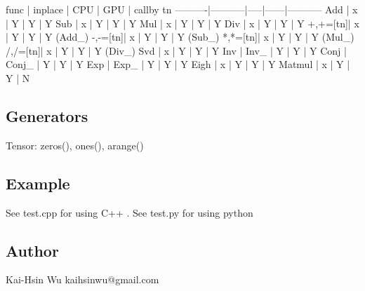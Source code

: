 \begin{DoxyVerb}  func    |   inplace | CPU | GPU  | callby tn 
----------|-----------|-----|------|-----------
  Add     |   x       |  Y  |  Y   |    Y
  Sub     |   x       |  Y  |  Y   |    Y
  Mul     |   x       |  Y  |  Y   |    Y
  Div     |   x       |  Y  |  Y   |    Y
  +,+=[tn]|   x       |  Y  |  Y   |    Y (Add_)
  -,-=[tn]|   x       |  Y  |  Y   |    Y (Sub_)
  *,*=[tn]|   x       |  Y  |  Y   |    Y (Mul_)
  /,/=[tn]|   x       |  Y  |  Y   |    Y (Div_)
  Svd     |   x       |  Y  |  Y   |    Y
  Inv     |   Inv_    |  Y  |  Y   |    Y
  Conj    |   Conj_   |  Y  |  Y   |    Y 
  Exp     |   Exp_    |  Y  |  Y   |    Y
  Eigh    |   x       |  Y  |  Y   |    Y 
  Matmul  |   x       |  Y  |  Y   |    N
\end{DoxyVerb}


\subsection*{Generators}

\begin{DoxyVerb}Tensor: zeros(), ones(), arange()
\end{DoxyVerb}


\subsection*{Example}

\begin{DoxyVerb}See test.cpp for using C++ .
See test.py for using python  
\end{DoxyVerb}


\subsection*{Author}

\begin{DoxyVerb}Kai-Hsin Wu kaihsinwu@gmail.com \end{DoxyVerb}
 